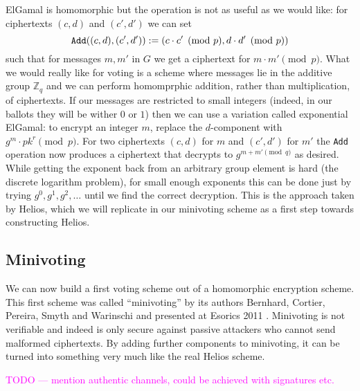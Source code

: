 \documentclass{llncs}
\newcommand{\alg}[1]{\textup{\texttt{#1}}}
\begin{document}
ElGamal is homomorphic but the operation is not as useful as we would like:
for ciphertexts $(c, d)$ and $(c', d')$ we can set
\[
\alg{Add}((c, d), (c', d')) := (c \cdot c' \pmod{p}, d \cdot d' \pmod{p})
\]
such that for messages $m, m'$ in $G$ we get a ciphertext for $m \cdot m'
\pmod{p}$. What we would really like for voting is a scheme where messages lie
in the additive group $\mathbb Z_q$ and we can perform homomprphic addition,
rather than multiplication, of ciphertexts. If our messages are restricted to
small integers (indeed, in our ballots they will be wither $0$ or $1$) then we
can use a variation called exponential ElGamal: to encrypt an integer $m$,
replace the $d$-component with $g^m \cdot pk^r \pmod{p}$. For two ciphertexts
$(c, d)$ for $m$ and $(c', d')$ for $m'$ the \alg{Add} operation now produces a
ciphertext that decrypts to $g^{m + m' \pmod{q}}$ as desired. While getting the
exponent back from an arbitrary group element is hard (the discrete logarithm
problem), for small enough exponents this can be done just by trying $g^0, g^1,
g^2, \ldots$ until we find the correct decryption. This is the approach taken by
Helios, which we will replicate in our minivoting scheme as a first step towards
constructing Helios.

\subsection{Minivoting}

We can now build a first voting scheme out of a homomorphic encryption scheme.
This first scheme was called ``minivoting'' by its authors Bernhard, Cortier,
Pereira, Smyth and Warinschi and presented at Esorics 2011 \cite{BCPSW11}.
Minivoting is not verifiable and indeed is only secure against passive attackers
who cannot send malformed ciphertexts. By adding further components to
minivoting, it can be turned into something very much like the real Helios
scheme.

\textcolor{Fuchsia}{TODO --- mention authentic channels, could be achieved with signatures etc.}
\end{document}
